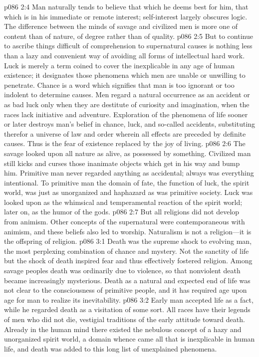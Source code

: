 \pc \vs p086 2:4 Man naturally tends to believe that which he deems best for him, that which is in his immediate or remote interest; self\hyp{}interest largely obscures logic. The difference between the minds of savage and civilized men is more one of content than of nature, of degree rather than of quality.
\vs p086 2:5 But to continue to ascribe things difficult of comprehension to supernatural causes is nothing less than a lazy and convenient way of avoiding all forms of intellectual hard work. Luck is merely a term coined to cover the inexplicable in any age of human existence; it designates those phenomena which men are unable or unwilling to penetrate. Chance is a word which signifies that man is too ignorant or too indolent to determine causes. Men regard a natural occurrence as an accident or as bad luck only when they are destitute of curiosity and imagination, when the races lack initiative and adventure. Exploration of the phenomena of life sooner or later destroys man’s belief in chance, luck, and so\hyp{}called accidents, substituting therefor a universe of law and order wherein all effects are preceded by definite causes. Thus is the fear of existence replaced by the joy of living.
\vs p086 2:6 The savage looked upon all nature as alive, as possessed by something. Civilized man still kicks and curses those inanimate objects which get in his way and bump him. Primitive man never regarded anything as accidental; always was everything intentional. To primitive man the domain of fate, the function of luck, the spirit world, was just as unorganized and haphazard as was primitive society. Luck was looked upon as the whimsical and temperamental reaction of the spirit world; later on, as the humor of the gods.
\vs p086 2:7 But all religions did not develop from animism. Other concepts of the supernatural were contemporaneous with animism, and these beliefs also led to worship. Naturalism is not a religion---it is the offspring of religion.
\vs p086 3:1 Death was the supreme shock to evolving man, the most perplexing combination of chance and mystery. Not the sanctity of life but the shock of death inspired fear and thus effectively fostered religion. Among savage peoples death was ordinarily due to violence, so that nonviolent death became increasingly mysterious. Death as a natural and expected end of life was not clear to the consciousness of primitive people, and it has required age upon age for man to realize its inevitability.
\pc \vs p086 3:2 Early man accepted life as a fact, while he regarded death as a visitation of some sort. All races have their legends of men who did not die, vestigial traditions of the early attitude toward death. Already in the human mind there existed the nebulous concept of a hazy and unorganized spirit world, a domain whence came all that is inexplicable in human life, and death was added to this long list of unexplained phenomena.
